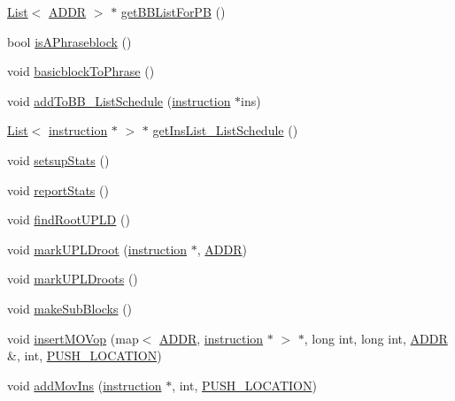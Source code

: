 \begin{DoxyCompactItemize}
\item 
\hyperlink{classList}{List}$<$ \hyperlink{binaryTranslator_2global_8h_a8bb6b77b3aab51e3a8d1866dd5861225}{ADDR} $>$ $\ast$ \hyperlink{classbasicblock_a4a68932d0628e028f4c5877cb888654c}{getBBListForPB} ()
\item 
bool \hyperlink{classbasicblock_a88276960d345d6849dbe02c9debbb94e}{isAPhraseblock} ()
\item 
void \hyperlink{classbasicblock_af48f1b1d1c2618185cf63aa36098092c}{basicblockToPhrase} ()
\item 
void \hyperlink{classbasicblock_abb72488dac0d405735a4cf82a1cdd0ce}{addToBB\_\-ListSchedule} (\hyperlink{classinstruction}{instruction} $\ast$ins)
\item 
\hyperlink{classList}{List}$<$ \hyperlink{classinstruction}{instruction} $\ast$ $>$ $\ast$ \hyperlink{classbasicblock_a87440b1ddb945365a4d32b356756ae24}{getInsList\_\-ListSchedule} ()
\item 
void \hyperlink{classbasicblock_a7ee1e79e21404965709f314b56baa695}{setsupStats} ()
\item 
void \hyperlink{classbasicblock_ae8a4cc290c3d290b04073649bd1ab28f}{reportStats} ()
\item 
void \hyperlink{classbasicblock_acafc046132a9107cbad5adcb1e013ffa}{findRootUPLD} ()
\item 
void \hyperlink{classbasicblock_a8f8234c300c0027293da7ea7b710d29c}{markUPLDroot} (\hyperlink{classinstruction}{instruction} $\ast$, \hyperlink{binaryTranslator_2global_8h_a8bb6b77b3aab51e3a8d1866dd5861225}{ADDR})
\item 
void \hyperlink{classbasicblock_ab238bfd0637d2761092e86e6517d3320}{markUPLDroots} ()
\item 
void \hyperlink{classbasicblock_aa5067cede8627ae1c7109fe33c9c440c}{makeSubBlocks} ()
\item 
void \hyperlink{classbasicblock_a688f53e1f072393e2a972974b57be536}{insertMOVop} (map$<$ \hyperlink{binaryTranslator_2global_8h_a8bb6b77b3aab51e3a8d1866dd5861225}{ADDR}, \hyperlink{classinstruction}{instruction} $\ast$ $>$ $\ast$, long int, long int, \hyperlink{binaryTranslator_2global_8h_a8bb6b77b3aab51e3a8d1866dd5861225}{ADDR} \&, int, \hyperlink{binaryTranslator_2global_8h_ae3190c0c46d1384e80f94a61ad275092}{PUSH\_\-LOCATION})
\item 
void \hyperlink{classbasicblock_a8743005759ce892482aa942cf0aa114d}{addMovIns} (\hyperlink{classinstruction}{instruction} $\ast$, int, \hyperlink{binaryTranslator_2global_8h_ae3190c0c46d1384e80f94a61ad275092}{PUSH\_\-LOCATION})

\end{DoxyCompactItemize}
